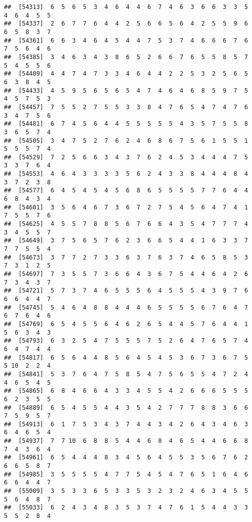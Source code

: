 \documentclass[
]{book}
\begin{document}
\begin{verbatim}
##  [54313]  6  5  6  5  3  4  6  4  4  6  7  4  6  3  6  6  3  3  5  4  6  4  5  5
##  [54337]  2  6  7  7  6  4  4  2  5  6  6  5  6  4  2  5  5  9  6  6  5  8  3  7
##  [54361]  6  6  3  4  6  4  5  4  4  7  5  3  7  4  6  6  6  7  6  7  5  6  4  6
##  [54385]  3  4  6  3  4  3  8  6  5  2  6  6  7  6  5  5  8  5  7  5  4  5  5  6
##  [54409]  4  4  7  4  7  3  3  4  6  4  4  2  2  5  3  2  5  6  5  6  3  8  4  5
##  [54433]  4  5  9  5  6  5  6  5  4  7  4  6  4  6  8  5  9  7  5  4  5  7  5  3
##  [54457]  7  5  5  2  7  5  5  3  3  8  4  7  6  5  4  7  4  7  6  3  4  7  5  6
##  [54481]  6  7  4  5  6  4  4  5  5  5  5  5  4  3  5  7  5  5  8  3  6  5  7  4
##  [54505]  3  4  7  5  2  7  6  2  4  6  8  6  7  5  6  1  5  5  1  5  5  5  7  4
##  [54529]  7  2  5  6  6  3  4  3  7  6  2  4  5  3  4  4  4  7  5  3  3  7  6  4
##  [54553]  4  6  4  3  3  3  3  5  6  2  4  3  3  8  4  4  4  8  4  3  7  2  3  8
##  [54577]  6  4  5  4  5  4  5  6  8  6  5  5  5  5  7  7  6  4  4  6  8  4  3  4
##  [54601]  3  5  6  4  6  7  3  6  7  2  7  5  4  5  6  4  7  4  1  7  5  5  7  6
##  [54625]  4  5  5  7  8  8  5  6  7  6  6  4  3  5  4  7  7  7  4  3  4  5  5  7
##  [54649]  3  7  5  6  5  7  6  2  3  6  6  5  4  4  1  6  3  3  7  7  7  5  5  4
##  [54673]  3  7  7  2  7  3  3  6  3  7  6  3  7  4  6  5  8  5  3  7  3  1  2  5
##  [54697]  7  3  5  5  7  3  6  6  4  3  6  7  5  4  4  6  4  2  6  7  3  4  3  7
##  [54721]  5  7  3  7  4  6  5  5  5  6  4  5  5  5  4  3  9  7  6  6  6  4  4  7
##  [54745]  5  4  6  4  8  8  4  4  4  6  5  5  5  5  6  7  6  4  7  6  7  6  4  6
##  [54769]  6  5  4  5  5  6  4  6  2  6  5  4  4  5  7  6  4  4  1  5  6  3  4  3
##  [54793]  6  3  2  5  4  7  5  5  5  7  5  2  6  4  7  6  5  7  4  6  4  7  4  4
##  [54817]  6  5  6  4  4  8  5  6  4  5  4  5  3  6  7  3  6  7  5  5 10  2  2  4
##  [54841]  5  3  7  6  4  7  5  8  5  4  7  5  6  5  5  4  7  2  4  4  6  5  4  5
##  [54865]  6  8  4  6  6  4  3  3  4  5  5  4  2  6  6  6  5  5  5  6  2  3  5  5
##  [54889]  6  5  4  5  5  4  4  3  5  4  2  7  7  7  8  8  3  6  6  7  5  9  5  7
##  [54913]  6  1  7  5  3  4  3  7  4  4  3  4  2  6  4  3  4  6  3  6  4  6  5  4
##  [54937]  7  7 10  6  8  8  5  4  4  6  8  4  6  5  4  4  6  6  8  7  4  3  6  4
##  [54961]  6  5  4  4  4  8  3  4  5  6  4  5  5  3  5  6  7  6  2  6  6  5  8  7
##  [54985]  3  5  5  5  5  4  7  7  5  4  5  4  7  6  5  1  6  4  6  6  6  4  4  7
##  [55009]  3  5  3  3  6  5  3  3  5  3  2  3  2  4  6  3  4  5  5  5  6  4  8  7
##  [55033]  6  2  4  3  4  8  3  5  3  7  4  7  6  1  5  4  4  3  3  5  5  2  8  4

\end{verbatim}
\end{document}
